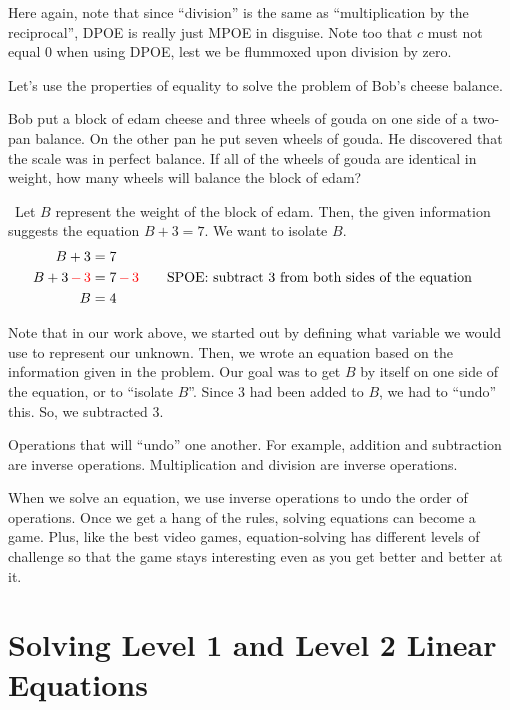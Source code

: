Here again, note that since ``division'' is the same as ``multiplication by the reciprocal'', DPOE is really just MPOE in disguise. Note too that $c$ must not equal 0 when using DPOE, lest we be flummoxed upon division by zero.

Let's use the properties of equality to solve the problem of Bob's cheese balance.

\begin{boxedex}
Bob put a block of edam cheese and three wheels of gouda on one side of a two-pan balance. On the other pan he put seven wheels of gouda. He discovered that the scale was in perfect balance. If all of the wheels of gouda are identical in weight, how many wheels will balance the block of edam?

\exsoln\ Let $B$ represent the weight of the block of edam. Then, the given information suggests the equation $B + 3 = 7$. We want to isolate $B$.
\[\begin{aligned}
B + 3 & = 7\\
B + 3 {\color{red} \,-\,3} & = 7 {\color{red} \,-\,3}
&&\text{\quad SPOE: subtract 3 from both sides of the equation}\\
B & = 4
\end{aligned}\]
\end{boxedex}

Note that in our work above, we started out by defining what variable we would use to represent our unknown. Then, we wrote an equation based on the information given in the problem. Our goal was to get $B$ by itself on one side of the equation, or to ``isolate $B$''. Since 3 had been added to $B$, we had to ``undo'' this. So, we subtracted 3.

\begin{boxeddef}
Operations that will ``undo'' one another. For example, addition and subtraction are inverse operations. Multiplication and division are inverse operations.
\end{boxeddef}

When we solve an equation, we use inverse operations to undo the order of operations. Once we get a hang of the rules, solving equations can become a game. Plus, like the best video games, equation-solving has different levels of challenge so that the game stays interesting even as you get better and better at it.


\section{Solving Level 1 and Level 2 Linear Equations}
\label{sec:linearlevels1and2}

